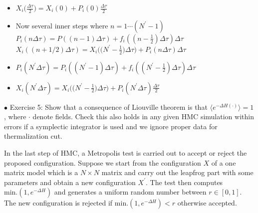 \documentclass[letter,11pt]{article}
\begin{document}
\vspace{7mm} 

\begin{center}
\begin{itemize}
	\item $X_{i}\big(\frac{\Delta \tau}{2}\big) = X_{i}(0) + P_{i}(0)\frac{\Delta \tau}{2}$
	\item Now several inner steps where $n =  1 \cdots (N^{\prime}-1)$
	\subitem $P_{i}(n \Delta \tau) = P((n-1) \Delta \tau) + f_{i}((n-\frac{1}{2}) \Delta \tau) \Delta \tau$ 
	\subitem $X_{i}((n + 1/2) \Delta \tau) = X_{i}\Big(\Big(N^{\prime} - \frac{1}{2}\Big) \Delta \tau\Big)  + P_{i}(n \Delta \tau) \Delta \tau$
	\item $P_{i}(N^{\prime} \Delta \tau) = P_{i}((N^{\prime}-1) \Delta \tau) + f_{i}((N^{\prime}-\frac{1}{2}) \Delta \tau) \Delta \tau$ 
	\item $X_{i}(N^{\prime} \Delta \tau) = X_{i}\Big(\Big(N^{\prime} - \frac{1}{2}\Big) \Delta \tau\Big) + P_{i}(N^{\prime} \Delta \tau) \frac{\Delta \tau}{2}$ 
\end{itemize} 
\end{center}


\vspace{7mm} 

    \begin{mdframed}[backgroundcolor=blue!3] 
    $\bullet$ Exercise 5: Show that a consequence of Liouville theorem is that $ \langle e^{-\Delta H(\boldsymbol{\cdot})} \rangle = 1$, where $\boldsymbol{\cdot}$ denote fields. Check this also holds in any given HMC simulation within errors if a symplectic integrator is used and we ignore proper data for thermalization cut.
    \end{mdframed} 
In the last step of HMC, a Metropolis test is carried out to accept or reject the proposed
configuration. Suppose we start from the configuration $X$ of a one matrix model 
which is a $N \times N$ matrix and carry out the leapfrog part with some parameters and obtain a new configuration 
$X^{\prime}$. The test then computes \texttt{$\text{min.}(1, e^{-\Delta H})$} and generates 
a uniform random number between $r \in [0,1]$. The new configuration is 
rejected if \texttt{$\text{min.}(1, e^{-\Delta H}) < r$} otherwise accepted. 


\end{document}
